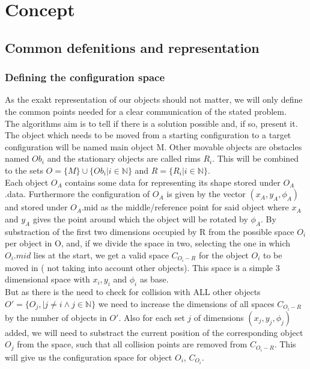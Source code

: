 \chapter{Concept}
\section{Common defenitions and representation}
\subsection{Defining the configuration space}
As the exakt representation of our objects should not matter, we will only define the common points needed for a clear communication of the stated problem.\\
The algorithms aim is to tell if there is a solution possible and, if so, present it. The object which needs to be moved from a starting configuration to a target configuration will be named main object M. Other movable objects are obstacles named $Ob_i$  and the stationary objects are called rims $R_i$. This will be combined to the sets $O = \{M\}  \cup \{Ob_i | i \in \mathbb{N} \} $ and $ R = \{ R_i | i \in \mathbb{N}\}$.\\

Each object $O_A$ contains some data for representing its shape stored under $O_A$.data. Furthermore the configuration of $O_A$ is given by the vector $(x_A,y_A,\phi_A)$ and stored under $O_A$.mid as the middle/reference point for said object where $x_A$ and $y_A$ gives the point around which the object will be rotated by $\phi_A$.
By substraction of the first two dimensions occupied by R from the possible space $O_i$ per object in O, and, if we divide the space in two, selecting the one in which $O_i.mid$ lies at the start, we get a valid space $C_{O_i-R}$ for the object $O_i$ to be moved in ( not taking into account other objects). This space is a simple 3 dimensional space with $x_i, y_i$ and $\phi_i$ as base.\\
But as there is the need to check for collision with ALL other objects $O' = \{O_j, | j\neq i \wedge j \in \mathbb{N}\} $ we need to increase the dimensions of all spaces $C_{O_i-R}$ by the number of objects in $O'$. Also for each set $j$ of dimensions $(x_j,y_j,\phi_j)$  added, we will need to substract the current position of the corresponding object $O_j$ from the space, such that all collision points are removed from $C_{O_i-R}$. This will give us the configuration space for object $O_i$, $C_{O_i}$.


